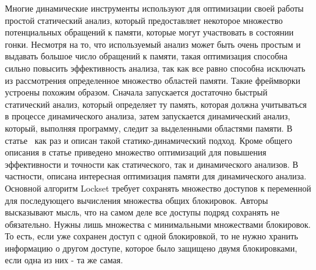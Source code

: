 

Многие динамические инструменты используют для оптимизации своей работы простой статический анализ, который предоставляет некоторое множество потенциальных обращений к памяти, которые могут участвовать в состоянии гонки.
Несмотря на то, что используемый анализ может быть очень простым и выдавать большое число обращений к памяти, такая оптимизация способна сильно повысить эффективность анализа, так как все равно способна исключать из рассмотрения определенное множество областей памяти.
Такие фреймворки устроены похожим образом.
Сначала запускается достаточно быстрый статический анализ, который определяет ту память, которая должна учитываться в процессе динамического анализа, затем запускается динамический анализ, который, выполняя программу, следит за выделенными областями памяти. 
В статье~\cite{Qi:2009:MPE} как раз и описан такой статико-динамический подход.
Кроме общего описания в статье приведено множество оптимизаций для повышения эффективности и точности как статического, так и динамического анализов.
В частности, описана интересная оптимизация памяти для динамического анализа. 
Основной алгоритм Lockset требует сохранять множество доступов к переменной для последующего вычисления множества общих блокировок.
Авторы высказывают мысль, что на самом деле все доступы подряд сохранять не обязательно.
Нужны лишь множества с минимальными множествами блокировок. То есть, если уже сохранен доступ с одной блокировкой, то не нужно хранить информацию о другом доступе, которое было защищено двумя блокировками, если одна из них - та же самая.

